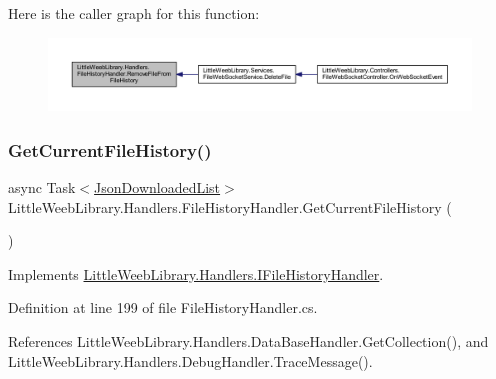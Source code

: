 Here is the caller graph for this function\+:\nopagebreak
\begin{figure}[H]
\begin{center}
\leavevmode
\includegraphics[width=350pt]{class_little_weeb_library_1_1_handlers_1_1_file_history_handler_a3b3f0cdedee405d607feff81c2de085d_icgraph}
\end{center}
\end{figure}
\mbox{\label{class_little_weeb_library_1_1_handlers_1_1_file_history_handler_a7e5a72e2cfdc3dfe97066cc7504b4445}} 
\subsubsection{\texorpdfstring{Get\+Current\+File\+History()}{GetCurrentFileHistory()}}
{\footnotesize\ttfamily async Task$<$\mbox{\hyperlink{class_little_weeb_library_1_1_models_1_1_json_downloaded_list}{Json\+Downloaded\+List}}$>$ Little\+Weeb\+Library.\+Handlers.\+File\+History\+Handler.\+Get\+Current\+File\+History (\begin{DoxyParamCaption}{ }\end{DoxyParamCaption})}



Implements \mbox{\hyperlink{interface_little_weeb_library_1_1_handlers_1_1_i_file_history_handler_a4c21e166d6be24e3378cdbbf938c4671}{Little\+Weeb\+Library.\+Handlers.\+I\+File\+History\+Handler}}.



Definition at line 199 of file File\+History\+Handler.\+cs.



References Little\+Weeb\+Library.\+Handlers.\+Data\+Base\+Handler.\+Get\+Collection(), and Little\+Weeb\+Library.\+Handlers.\+Debug\+Handler.\+Trace\+Message().



